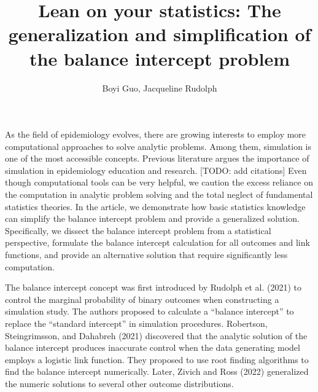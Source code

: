 \documentclass[
]{article}
\title{Lean on your statistics: The generalization and simplification of
the balance intercept problem}
\author{Boyi Guo, Jacqueline Rudolph}
\date{}
\begin{document}
\maketitle

As the field of epidemiology evolves, there are growing interests to
employ more computational approaches to solve analytic problems. Among
them, simulation is one of the most accessible concepts. Previous
literature argues the importance of simulation in epidemiology education
and research. {[}TODO: add citations{]} Even though computational tools
can be very helpful, we caution the excess reliance on the computation
in analytic problem solving and the total neglect of fundamental
statistics theories. In the article, we demonstrate how basic statistics
knowledge can simplify the balance intercept problem and provide a
generalized solution. Specifically, we dissect the balance intercept
problem from a statistical perspective, formulate the balance intercept
calculation for all outcomes and link functions, and provide an
alternative solution that require significantly less computation.

The balance intercept concept was first introduced by Rudolph et al.
(2021) to control the marginal probability of binary outcomes when
constructing a simulation study. The authors proposed to calculate a
``balance intercept'' to replace the ``standard intercept'' in
simulation procedures. Robertson, Steingrimsson, and Dahabreh (2021)
discovered that the analytic solution of the balance intercept produces
inaccurate control when the data generating model employs a logistic
link function. They proposed to use root finding algorithms to find the
balance intercept numerically. Later, Zivich and Ross (2022) generalized
the numeric solutions to several other outcome distributions.
\end{document}
